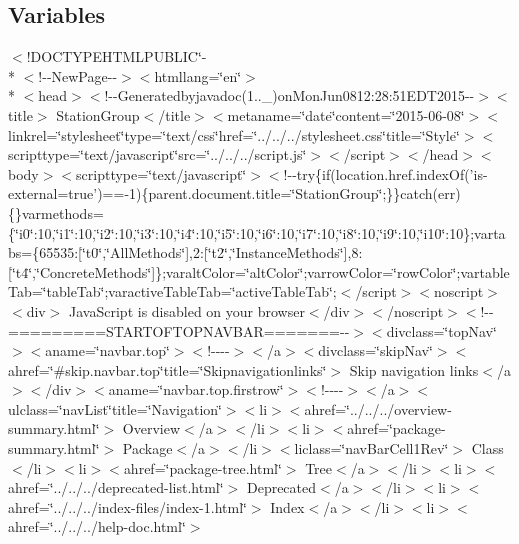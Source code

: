 \subsection*{Variables}
\begin{DoxyCompactItemize}
\item 
$<$!D\-O\-C\-T\-Y\-P\-E\-H\-T\-M\-L\-P\-U\-B\-L\-I\-C\char`\"{}-\/\\*
$<$!-\/-\/New\-Page-\/-\/$>$$<$htmllang=\char`\"{}en\char`\"{}$>$\\*
$<$head$>$$<$!-\/-\/Generatedbyjavadoc(1..\-\_)on\-Mon\-Jun0812\-:28\-:51\-E\-D\-T2015-\/-\/$>$$<$title$>$ Station\-Group$<$/title$>$$<$metaname=\char`\"{}date\char`\"{}content=\char`\"{}2015-\/06-\/08\char`\"{}$>$$<$linkrel=\char`\"{}stylesheet\char`\"{}type=\char`\"{}text/css\char`\"{}href=\char`\"{}../../../stylesheet.\-css\char`\"{}title=\char`\"{}\-Style\char`\"{}$>$$<$scripttype=\char`\"{}text/javascript\char`\"{}src=\char`\"{}../../../script.\-js\char`\"{}$>$$<$/script$>$$<$/head$>$$<$body$>$$<$scripttype=\char`\"{}text/javascript\char`\"{}$>$$<$!-\/-\/try\{if(location.\-href.\-index\-Of('is-\/external=true')==-\/1)\{parent.\-document.\-title=\char`\"{}\-Station\-Group\char`\"{};\}\}catch(err)\{\}varmethods=\{\char`\"{}i0\char`\"{}\-:10,\char`\"{}i1\char`\"{}\-:10,\char`\"{}i2\char`\"{}\-:10,\char`\"{}i3\char`\"{}\-:10,\char`\"{}i4\char`\"{}\-:10,\char`\"{}i5\char`\"{}\-:10,\char`\"{}i6\char`\"{}\-:10,\char`\"{}i7\char`\"{}\-:10,\char`\"{}i8\char`\"{}\-:10,\char`\"{}i9\char`\"{}\-:10,\char`\"{}i10\char`\"{}\-:10\};vartabs=\{65535\-:\mbox{[}\char`\"{}t0\char`\"{},\char`\"{}\-All\-Methods\char`\"{}\mbox{]},2\-:\mbox{[}\char`\"{}t2\char`\"{},\char`\"{}\-Instance\-Methods\char`\"{}\mbox{]},8\-:\mbox{[}\char`\"{}t4\char`\"{},\char`\"{}\-Concrete\-Methods\char`\"{}\mbox{]}\};varalt\-Color=\char`\"{}alt\-Color\char`\"{};varrow\-Color=\char`\"{}row\-Color\char`\"{};vartable\-Tab=\char`\"{}table\-Tab\char`\"{};varactive\-Table\-Tab=\char`\"{}active\-Table\-Tab\char`\"{};$<$/script$>$$<$noscript$>$$<$div$>$ Java\-Script is disabled on your browser$<$/div$>$$<$/noscript$>$$<$!-\/-\/=========\-S\-T\-A\-R\-T\-O\-F\-T\-O\-P\-N\-A\-V\-B\-A\-R=======-\/-\/$>$$<$divclass=\char`\"{}top\-Nav\char`\"{}$>$$<$aname=\char`\"{}navbar.\-top\char`\"{}$>$$<$!-\/-\/-\/-\/$>$$<$/a$>$$<$divclass=\char`\"{}skip\-Nav\char`\"{}$>$$<$ahref=\char`\"{}\#skip.\-navbar.\-top\char`\"{}title=\char`\"{}\-Skipnavigationlinks\char`\"{}$>$ Skip navigation links$<$/a$>$$<$/div$>$$<$aname=\char`\"{}navbar.\-top.\-firstrow\char`\"{}$>$$<$!-\/-\/-\/-\/$>$$<$/a$>$$<$ulclass=\char`\"{}nav\-List\char`\"{}title=\char`\"{}\-Navigation\char`\"{}$>$$<$li$>$$<$ahref=\char`\"{}../../../overview-\/summary.\-html\char`\"{}$>$ Overview$<$/a$>$$<$/li$>$$<$li$>$$<$ahref=\char`\"{}package-\/summary.\-html\char`\"{}$>$ Package$<$/a$>$$<$/li$>$$<$liclass=\char`\"{}nav\-Bar\-Cell1\-Rev\char`\"{}$>$ Class$<$/li$>$$<$li$>$$<$ahref=\char`\"{}package-\/tree.\-html\char`\"{}$>$ Tree$<$/a$>$$<$/li$>$$<$li$>$$<$ahref=\char`\"{}../../../deprecated-\/list.\-html\char`\"{}$>$ Deprecated$<$/a$>$$<$/li$>$$<$li$>$$<$ahref=\char`\"{}../../../index-\/files/index-\/1.\-html\char`\"{}$>$ Index$<$/a$>$$<$/li$>$$<$li$>$$<$ahref=\char`\"{}../../../help-\/doc.\-html\char`\"{}$>$ $$
\end{DoxyCompactItemize}
